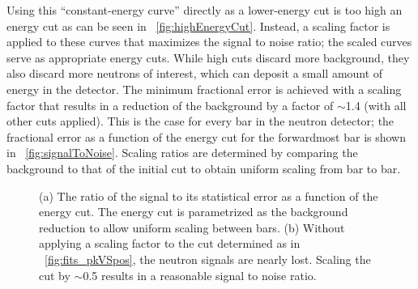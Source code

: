Using this ``constant-energy curve'' directly as a lower-energy cut is too high an energy cut as can be seen in {\fig}~\ref{fig:highEnergyCut}.  Instead, a scaling factor is applied to these curves that maximizes the signal to noise ratio; the scaled curves serve as appropriate energy cuts.  While high cuts discard more background, they also discard more neutrons of interest, which can deposit a small amount of energy in the detector.  The minimum fractional error is achieved with a scaling factor that results in a reduction of the background by a factor of $\sim$1.4 (with all other cuts applied).  This is the case for every bar in the neutron detector; the fractional error as a function of the energy cut for the forwardmost bar is shown in {\fig}~\ref{fig:signalToNoise}.  Scaling ratios are determined by comparing the background to that of the initial cut to obtain uniform scaling from bar to bar.  
\begin{figure}[!htbp]
\centering
{}
\hspace{8pt}
\caption[Optimizing the scale of the low-energy position cut for minimum fractional error.]{(a) The ratio of the signal to its statistical error as a function of the energy cut.  The energy cut is parametrized as the background reduction to allow uniform scaling between bars. (b) Without applying a scaling factor to the cut determined as in {\fig}~\ref{fig:fits_pkVSpos}, the neutron signals are nearly lost.  Scaling the cut by $\sim$0.5 results in a reasonable signal to noise ratio.}
\label{fig:scalingFactorEffect}
\end{figure}
